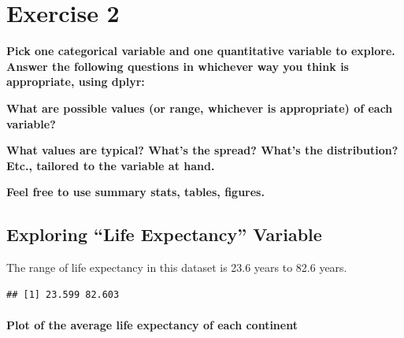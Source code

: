 \documentclass[]{article}
\newenvironment{Shaded}{\begin{snugshade}}{\end{snugshade}}
\newcommand{\KeywordTok}[1]{\textcolor[rgb]{0.13,0.29,0.53}{\textbf{#1}}}
\newcommand{\NormalTok}[1]{#1}
\newcommand{\OperatorTok}[1]{\textcolor[rgb]{0.81,0.36,0.00}{\textbf{#1}}}
\let\oldparagraph\paragraph
\renewcommand{\paragraph}[1]{\oldparagraph{#1}\mbox{}}
\begin{document}
\hypertarget{exercise-2}{%
\section{Exercise 2}\label{exercise-2}}

\textbf{Pick one categorical variable and one quantitative variable to
explore. Answer the following questions in whichever way you think is
appropriate, using dplyr:}

\textbf{What are possible values (or range, whichever is appropriate) of
each variable?}

\textbf{What values are typical? What's the spread? What's the
distribution? Etc., tailored to the variable at hand.}

\textbf{Feel free to use summary stats, tables, figures.}

\hypertarget{exploring-life-expectancy-variable}{%
\subsection{Exploring ``Life Expectancy''
Variable}\label{exploring-life-expectancy-variable}}

The range of life expectancy in this dataset is 23.6 years to 82.6
years.

\begin{Shaded}
\end{Shaded}

\begin{verbatim}
## [1] 23.599 82.603
\end{verbatim}

\hypertarget{plot-of-the-average-life-expectancy-of-each-continent}{%
\paragraph{Plot of the average life expectancy of each
continent}\label{plot-of-the-average-life-expectancy-of-each-continent}}
\end{document}
